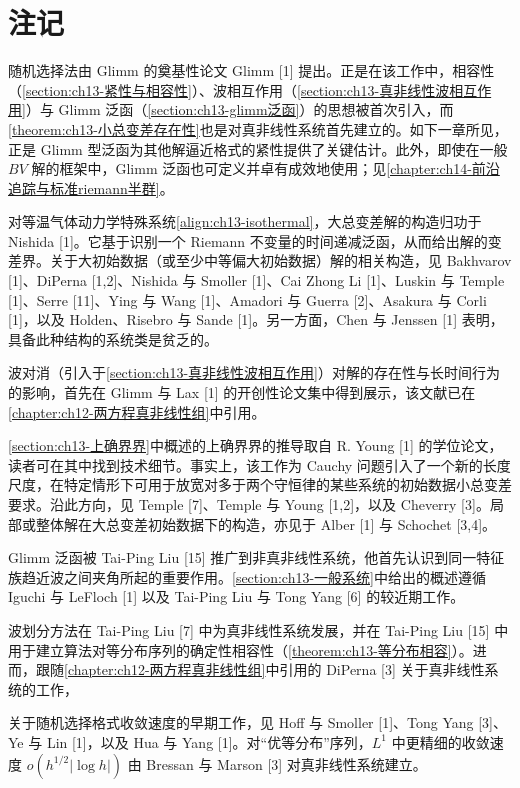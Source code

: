 \documentclass[../../main.tex]{subfiles}
\begin{document}
\section{注记}\label{section:ch13-注记}

随机选择法由 Glimm 的奠基性论文 Glimm [1] 提出。正是在该工作中，相容性（\cref{section:ch13-紧性与相容性}）、波相互作用（\cref{section:ch13-真非线性波相互作用}）与 Glimm 泛函（\cref{section:ch13-glimm泛函}）的思想被首次引入，而\cref{theorem:ch13-小总变差存在性}也是对真非线性系统首先建立的。如下一章所见，正是 Glimm 型泛函为其他解逼近格式的紧性提供了关键估计。此外，即使在一般 $BV$ 解的框架中，Glimm 泛函也可定义并卓有成效地使用；见\cref{chapter:ch14-前沿追踪与标准riemann半群}。

对等温气体动力学特殊系统\eqref{align:ch13-isothermal}，大总变差解的构造归功于 Nishida [1]。它基于识别一个 Riemann 不变量的时间递减泛函，从而给出解的变差界。关于大初始数据（或至少中等偏大初始数据）解的相关构造，见 Bakhvarov [1]、DiPerna [1,2]、Nishida 与 Smoller [1]、Cai Zhong Li [1]、Luskin 与 Temple [1]、Serre [11]、Ying 与 Wang [1]、Amadori 与 Guerra [2]、Asakura 与 Corli [1]，以及 Holden、Risebro 与 Sande [1]。另一方面，Chen 与 Jenssen [1] 表明，具备此种结构的系统类是贫乏的。

波对消（引入于\cref{section:ch13-真非线性波相互作用}）对解的存在性与长时间行为的影响，首先在 Glimm 与 Lax [1] 的开创性论文集中得到展示，该文献已在\cref{chapter:ch12-两方程真非线性组}中引用。

\cref{section:ch13-上确界界}中概述的上确界界的推导取自 R. Young [1] 的学位论文，读者可在其中找到技术细节。事实上，该工作为 Cauchy 问题引入了一个新的长度尺度，在特定情形下可用于放宽对多于两个守恒律的某些系统的初始数据小总变差要求。沿此方向，见 Temple [7]、Temple 与 Young [1,2]，以及 Cheverry [3]。局部或整体解在大总变差初始数据下的构造，亦见于 Alber [1] 与 Schochet [3,4]。

Glimm 泛函被 Tai-Ping Liu [15] 推广到非真非线性系统，他首先认识到同一特征族趋近波之间夹角所起的重要作用。\cref{section:ch13-一般系统}中给出的概述遵循 Iguchi 与 LeFloch [1] 以及 Tai-Ping Liu 与 Tong Yang [6] 的较近期工作。

波划分方法在 Tai-Ping Liu [7] 中为真非线性系统发展，并在 Tai-Ping Liu [15] 中用于建立算法对等分布序列的确定性相容性（\cref{theorem:ch13-等分布相容}）。进而，跟随\cref{chapter:ch12-两方程真非线性组}中引用的 DiPerna [3] 关于真非线性系统的工作，

关于随机选择格式收敛速度的早期工作，见 Hoff 与 Smoller [1]、Tong Yang [3]、Ye 与 Lin [1]，以及 Hua 与 Yang [1]。对``优等分布''序列，$L^1$ 中更精细的收敛速度 $o(h^{1/2}|\log h|)$ 由 Bressan 与 Marson [3] 对真非线性系统建立。
\end{document}
